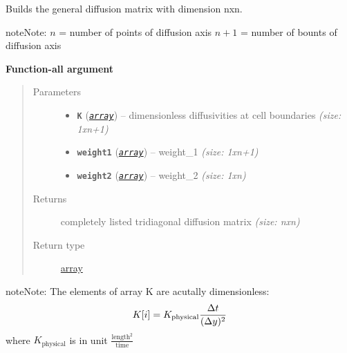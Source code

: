 \documentclass[a4paper,10pt,english]{sphinxmanual}
\begin{document}
\begin{fulllineitems}
\label{api/climlab.dynamics:climlab.dynamics.diffusion._make_diffusion_matrix}
Builds the general diffusion matrix with dimension nxn.

\begin{notice}{note}{Note:}
\(n\)   = number of points of diffusion axis
\(n+1\) = number of bounts of diffusion axis
\end{notice}

\textbf{Function-all argument}
\begin{quote}\begin{description}
\item[{Parameters}] \leavevmode\begin{itemize}
\item {} 
\textbf{\texttt{K}} (\href{http://docs.python.org/2.7/library/array.html\#module-array}{\emph{\texttt{array}}}) -- dimensionless diffusivities at cell boundaries
\emph{(size: 1xn+1)}

\item {} 
\textbf{\texttt{weight1}} (\href{http://docs.python.org/2.7/library/array.html\#module-array}{\emph{\texttt{array}}}) -- weight\_1 \emph{(size: 1xn+1)}

\item {} 
\textbf{\texttt{weight2}} (\href{http://docs.python.org/2.7/library/array.html\#module-array}{\emph{\texttt{array}}}) -- weight\_2 \emph{(size: 1xn)}

\end{itemize}

\item[{Returns}] \leavevmode
completely listed tridiagonal diffusion matrix \emph{(size: nxn)}

\item[{Return type}] \leavevmode
\href{http://docs.python.org/2.7/library/array.html\#module-array}{array}

\end{description}\end{quote}

\begin{notice}{note}{Note:}
The elements of array K are acutally dimensionless:
\begin{gather}
\begin{split}K[i] = K_{\textrm{physical}}  \frac{\Delta t}{(\Delta y)^2}\end{split}\notag
\end{gather}
where \(K_{\textrm{physical}}\) is in unit \(\frac{\textrm{length}^2}{\textrm{time}}\)
\end{notice}


\end{fulllineitems}
\end{document}
